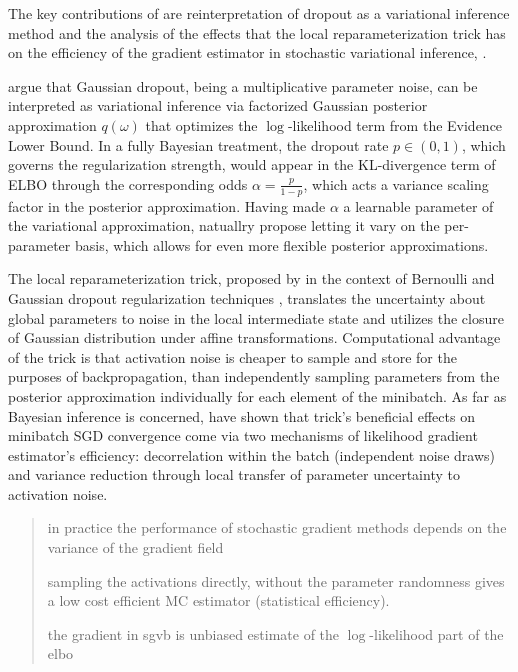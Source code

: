 \documentclass[a4paper,10pt]{article}
\begin{document}
The key contributions of \cite{kingma_variational_2015} are reinterpretation of dropout
as a variational inference method and the analysis of the effects that the local reparameterization
trick has on the efficiency of the gradient estimator in stochastic variational inference,
\cite{citation_needed}.

\cite{kingmaetal2015} argue that Gaussian dropout, being a multiplicative parameter noise,
can be interpreted as variational inference via factorized Gaussian posterior approximation
$q(\omega)$ that optimizes the $\log$-likelihood term from the Evidence Lower Bound. In a fully
Bayesian treatment, the dropout rate $p \in (0, 1)$, which governs the regularization strength,
would appear in the KL-divergence term of ELBO through the corresponding odds $
  \alpha = \tfrac{p}{1-p}
$, which acts a variance scaling factor in the posterior approximation. Having made $\alpha$
a learnable parameter of the variational approximation, \cite{kingmaetal2015} natuallry propose
letting it vary on the per-parameter basis, which allows for even more flexible posterior
approximations. %

The local reparameterization trick, proposed by \cite{citation_wang_menning_2013} in the context
of Bernoulli and Gaussian dropout regularization techniques \cite{citation_needed}, translates
the uncertainty about global parameters to noise in the local intermediate state and utilizes
the closure of Gaussian distribution under affine transformations. Computational advantage of
the trick is that activation noise is cheaper to sample and store for the purposes of backpropagation,
than independently sampling parameters from the posterior approximation individually for each
element of the minibatch. As far as Bayesian inference is concerned, \cite{kingma_variational_2015}
have shown that trick's beneficial effects on minibatch SGD convergence come via two mechanisms
of likelihood gradient estimator's efficiency: decorrelation within the batch (independent noise
draws) and variance reduction through local transfer of parameter uncertainty to activation noise.

\begin{quote}

in practice the performance of stochastic gradient methods depends on the variance of the gradient
field

sampling the activations directly, without the parameter randomness gives a low cost efficient
MC estimator (statistical efficiency).

the gradient in sgvb is unbiased estimate of the $\log$-likelihood part of the elbo

\end{quote}
\end{document}
